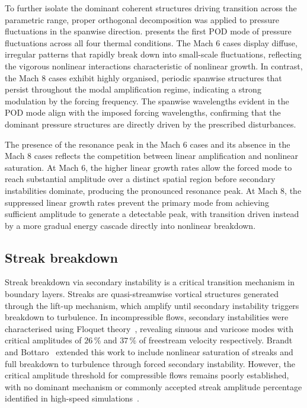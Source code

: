 To further isolate the dominant coherent structures driving transition across the parametric range, proper orthogonal decomposition was applied to pressure fluctuations in the spanwise direction.  presents the first POD mode of pressure fluctuations across all four thermal conditions. The Mach 6 cases display diffuse, irregular patterns that rapidly break down into small-scale fluctuations, reflecting the vigorous nonlinear interactions characteristic of nonlinear growth. In contrast, the Mach 8 cases exhibit highly organised, periodic spanwise structures that persist throughout the modal amplification regime, indicating a strong modulation by the forcing frequency. The spanwise wavelengths evident in the \gls{POD} mode align with the imposed forcing wavelengths, confirming that the dominant pressure structures are directly driven by the prescribed disturbances.

The presence of the resonance peak in the Mach 6 cases and its absence in the Mach 8 cases reflects the competition between linear amplification and nonlinear saturation. At Mach 6, the higher linear growth rates allow the forced mode to reach substantial amplitude over a distinct spatial region before secondary instabilities dominate, producing the pronounced resonance peak. At Mach 8, the suppressed linear growth rates prevent the primary mode from achieving sufficient amplitude to generate a detectable peak, with transition driven instead by a more gradual energy cascade directly into nonlinear breakdown.


\subsection{Streak breakdown}

Streak breakdown via secondary instability is a critical transition mechanism in boundary layers. Streaks are quasi-streamwise vortical structures generated through the lift-up mechanism, which amplify until secondary instability triggers breakdown to turbulence. In incompressible flows, secondary instabilities were characterised using Floquet theory~\citep{Andersson2001}, revealing sinuous and varicose modes with critical amplitudes of $26\,\%$ and $37\,\%$ of freestream velocity respectively. Brandt and Bottaro~\citep{BrandtBottaro2001} extended this work to include nonlinear saturation of streaks and full breakdown to turbulence through forced secondary instability. However, the critical amplitude threshold for compressible flows remains poorly established, with no dominant mechanism or commonly accepted streak amplitude percentage identified in high-speed simulations~\citep{Franko2013}.

